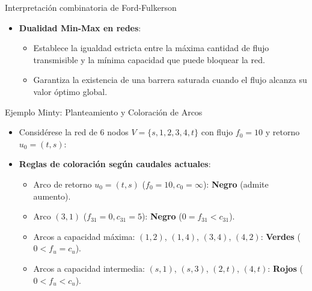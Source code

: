 \documentclass[
  ignorenonframetext,
]{beamer}
\providecommand{\tightlist}{%
  \setlength{\itemsep}{0pt}\setlength{\parskip}{0pt}}
\begin{document}
\begin{frame}{Interpretación combinatoria de Ford-Fulkerson}
\label{interpretaciuxf3n-combinatoria-de-ford-fulkerson}
\begin{itemize}
\tightlist
\item
  \textbf{Dualidad Min-Max en redes}:

  \begin{itemize}
  \tightlist
  \item
    Establece la igualdad estricta entre la máxima cantidad de flujo
    transmisible y la mínima capacidad que puede bloquear la red.
  \item
    Garantiza la existencia de una barrera saturada cuando el flujo
    alcanza su valor óptimo global.
  \end{itemize}
\end{itemize}
\end{frame}

\begin{frame}{Ejemplo Minty: Planteamiento y Coloración de Arcos}
\label{ejemplo-minty-planteamiento-y-coloraciuxf3n-de-arcos}
\begin{itemize}
\tightlist
\item
  Considérese la red de 6 nodos \(V = \{s, 1, 2, 3, 4, t\}\) con flujo
  \(f_0 = 10\) y retorno \(u_0 = (t, s)\):
\item
  \textbf{Reglas de coloración según caudales actuales}:

  \begin{itemize}
  \tightlist
  \item
    Arco de retorno \(u_0 = (t, s)\) (\(f_0 = 10, c_0 = \infty\)):
    \textbf{Negro} (admite aumento).
  \item
    Arco \((3, 1)\) (\(f_{31} = 0, c_{31} = 5\)): \textbf{Negro}
    (\(0 = f_{31} < c_{31}\)).
  \item
    Arcos a capacidad máxima: \((1,2)\), \((1,4)\), \((3,4)\),
    \((4,2)\): \textbf{Verdes} (\(0 < f_u = c_u\)).
  \item
    Arcos a capacidad intermedia: \((s,1)\), \((s,3)\), \((2,t)\),
    \((4,t)\): \textbf{Rojos} (\(0 < f_u < c_u\)).
  \end{itemize}
\end{itemize}
\end{frame}
\end{document}
